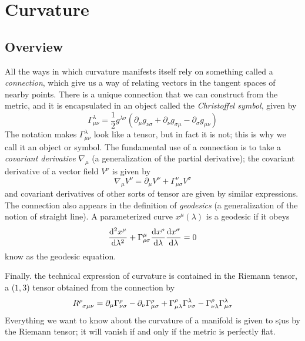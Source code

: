 \section{Curvature}\label{sec:3}

\subsection{Overview}
All the ways in which curvature manifests itself rely on something called a \textit{connection}, which give us a way of relating vectors in the tangent spaces of nearby points. There is a unique connection that we can construct from the metric, and it is encapsulated in an object called the \textit{Christoffel symbol}, given by
\begin{equation*}
    \Gamma^\lambda_{\mu\nu}=\frac{1}{2}g^{\lambda\sigma}(\partial_\mu g_{\nu\sigma}+\partial_\nu g_{\sigma\mu}-\partial_\sigma g_{\mu\nu})
\end{equation*}
The notation makes $\Gamma^\lambda_{\mu\nu}$ look like a tensor, but in fact it is not; this is why we call it an object or symbol. The fundamental use of a connection is to take a \textit{covariant derivative} $\nabla_\mu$ (a generalization of the partial derivative); the covariant derivative of a vector field $V^\nu$ is given by
\begin{equation*}
    \nabla_{\mu}V^\nu=\partial_\mu V^\nu +\Gamma^\nu_{\mu\sigma} V^\sigma
\end{equation*}
and covariant derivatives of other sorts of tensor are given by similar expressions. The connection also appears in the definition of \textit{geodesics} (a generalization of the notion of straight line). A parameterized curve $x^\mu(\lambda)$ is a geodesic if it obeys
\begin{equation*}
    \dv[2]{x^\mu}{\lambda}+\Gamma^\mu_{\rho\sigma}\dv{x^\rho}{\lambda}\dv{x^\sigma}{\lambda}=0
\end{equation*}
know as the geodesic equation.

Finally. the technical expression of curvature is contained in the Riemann tensor, a ($1,3$) tensor obtained from the connection by
\begin{equation*}
    \tensor{R}{^\rho_{\sigma\mu\nu}}=\partial_\mu\Gamma^\rho_{\nu\sigma}-\partial_\nu\Gamma^\rho_{\mu\sigma}+ \Gamma^\rho_{\mu\lambda}\Gamma^\lambda_{\nu\sigma} -\Gamma^\rho_{\nu\lambda}\Gamma^\lambda_{\mu\sigma}
\end{equation*}
Everything we want to know about the curvature of a manifold is given to s¡us by the Riemann tensor; it will vanish if and only if the metric is perfectly flat.



